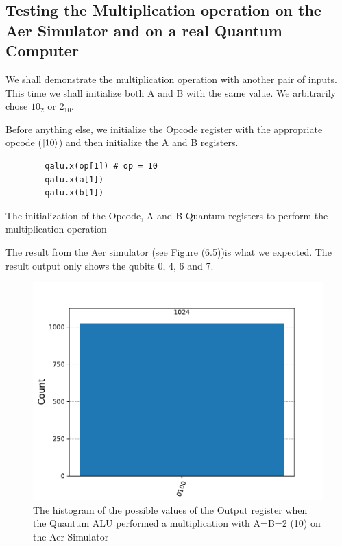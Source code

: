 \subsection{Testing the Multiplication operation on the Aer Simulator and on a real Quantum Computer}
We shall demonstrate the multiplication operation with another pair of inputs. This time we shall initialize both A and B with the same value. We
arbitrarily chose $10_2$ or $2_{10}$.

Before anything else, we initialize the Opcode register with the appropriate opcode ($\ket{10}$) and then initialize the A and B registers.

\begin{listing}[!ht]
    \centering
    \begin{verbatim}
        qalu.x(op[1]) # op = 10
        qalu.x(a[1])
        qalu.x(b[1])
    \end{verbatim}
    \caption{The initialization of the Opcode, A and B Quantum registers to perform the multiplication operation}
\end{listing}

The result from the Aer simulator (see Figure (6.5))is what we expected. The result output only shows the qubits 0, 4, 6 and 7.

\begin{figure}[!ht]
    \centering
    \includegraphics[scale=0.7]{images/6_Complete_System/multiplier_aer_result.pdf}
    \caption{The histogram of the possible values of the Output register when the Quantum ALU performed a multiplication with A=B=2 (10) on the Aer Simulator}
\end{figure}

